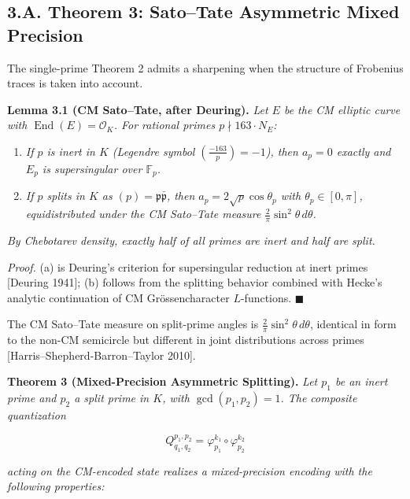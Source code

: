 \documentclass[
  11pt,
]{article}
\begin{document}
\hypertarget{a.-theorem-3-satotate-asymmetric-mixed-precision}{%
\subsection{3.A. Theorem 3: Sato--Tate Asymmetric Mixed
Precision}\label{a.-theorem-3-satotate-asymmetric-mixed-precision}}

The single-prime Theorem 2 admits a sharpening when the structure of
Frobenius traces is taken into account.

\textbf{Lemma 3.1 (CM Sato--Tate, after Deuring).} \emph{Let \(E\) be
the CM elliptic curve with \(\operatorname{End}(E) = \mathcal{O}_K\).
For rational primes \(p \nmid 163 \cdot N_E\):}

\begin{enumerate}
\def\labelenumi{(\alph{enumi})}
\item
  \emph{If \(p\) is inert in \(K\) (Legendre symbol
  \(\left(\frac{-163}{p}\right) = -1\)), then \(a_p = 0\) exactly and
  \(E_p\) is supersingular over \(\mathbb{F}_p\).}
\item
  \emph{If \(p\) splits in \(K\) as
  \((p) = \mathfrak{p} \bar{\mathfrak{p}}\), then
  \(a_p = 2\sqrt{p}\cos\theta_p\) with \(\theta_p \in [0, \pi]\),
  equidistributed under the CM Sato--Tate measure
  \(\frac{2}{\pi}\sin^2\theta \, d\theta\).}
\end{enumerate}

\emph{By Chebotarev density, exactly half of all primes are inert and
half are split.}

\emph{Proof.} (a) is Deuring's criterion for supersingular reduction at
inert primes {[}Deuring 1941{]}; (b) follows from the splitting behavior
combined with Hecke's analytic continuation of CM Grössencharacter
\(L\)-functions. \(\blacksquare\)

The CM Sato--Tate measure on split-prime angles is
\(\frac{2}{\pi}\sin^2\theta\, d\theta\), identical in form to the non-CM
semicircle but different in joint distributions across primes
{[}Harris--Shepherd-Barron--Taylor 2010{]}.

\textbf{Theorem 3 (Mixed-Precision Asymmetric Splitting).} \emph{Let
\(p_1\) be an inert prime and \(p_2\) a split prime in \(K\), with
\(\gcd(p_1, p_2) = 1\). The composite quantization}

\[Q_{q_1, q_2}^{p_1, p_2} = \varphi_{p_1}^{k_1} \circ \varphi_{p_2}^{k_2}\]

\emph{acting on the CM-encoded state realizes a mixed-precision encoding
with the following properties:}
\end{document}
